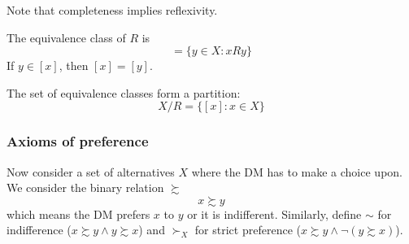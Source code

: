 \documentclass[12pt]{extarticle}
\begin{document}
Note that completeness implies reflexivity.

The equivalence class of $R$ is
\begin{equation}
    [x] = \{ y \in X : xRy \}
\end{equation}
If $y \in [x]$, then $[x] = [y]$.

The set of equivalence classes form a partition:
\begin{equation}
    X/R = \{ [x] : x \in X \}
\end{equation}

\subsubsection{Axioms of preference}

Now consider a set of alternatives $X$ where the DM has to make a choice upon.
We consider the binary relation $\succsim$
\begin{equation}
    x \succsim y
\end{equation}
which means the DM prefers $x$ to $y$ or it is indifferent.
Similarly, define $\sim$ for indifference ($x \succsim y \land y \succsim x$) and
$\succ_X$ for strict preference ($x \succsim y \land \lnot (y \succsim x)$).
\end{document}
